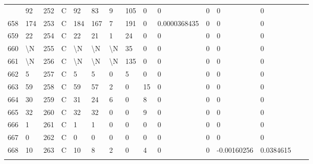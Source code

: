 \begin{longtable}{lllllllllllllll}
\begin{comment}
	657 & 92                & 252 & C   & 92                & 83                & 9                 & 105  & 0          & 0              & 0              & 0             & 0            \\
	658 & 174               & 253 & C   & 184               & 167               & 7                 & 191  & 0          & 0.0000368435   & 0              & 0             & 0            \\
	659 & 22                & 254 & C   & 22                & 21                & 1                 & 24   & 0          & 0              & 0              & 0             & 0            \\
	660 & \textbackslash{}N & 255 & C   & \textbackslash{}N & \textbackslash{}N & \textbackslash{}N & 35   & 0          & 0              & 0              & 0             & 0            \\
	661 & \textbackslash{}N & 256 & C   & \textbackslash{}N & \textbackslash{}N & \textbackslash{}N & 135  & 0          & 0              & 0              & 0             & 0            \\
	662 & 5                 & 257 & C   & 5                 & 5                 & 0                 & 5    & 0          & 0              & 0              & 0             & 0            \\
	663 & 59                & 258 & C   & 59                & 57                & 2                 & 0    & 15         & 0              & 0              & 0             & 0            \\
	664 & 30                & 259 & C   & 31                & 24                & 6                 & 0    & 8          & 0              & 0              & 0             & 0            \\
	665 & 32                & 260 & C   & 32                & 32                & 0                 & 0    & 9          & 0              & 0              & 0             & 0            \\
	666 & 1                 & 261 & C   & 1                 & 1                 & 0                 & 0    & 0          & 0              & 0              & 0             & 0            \\
	667 & 0                 & 262 & C   & 0                 & 0                 & 0                 & 0    & 0          & 0              & 0              & 0             & 0            \\
	668 & 10                & 263 & C   & 10                & 8                 & 2                 & 0    & 4          & 0              & 0              & -0.00160256   & 0.0384615    \\

\end{comment}
\end{longtable}
